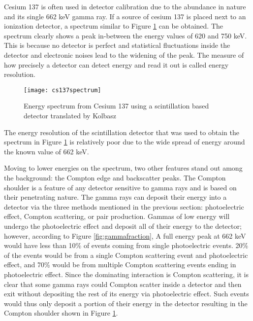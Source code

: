Cesium 137 is often used in detector calibration due to the abundance in nature and its single 662 keV gamma ray.
If a source of cesium 137 is placed next to an ionization detector, a spectrum similar to Figure \ref{fig:cs137spectrum} can be obtained.
The spectrum clearly shows a peak in-between the energy values of 620 and 750 keV.
This is because no detector is perfect and statistical fluctuations inside the detector and electronic noises lead to the widening of the peak.
The measure of how precisely a detector can detect energy and read it out is called energy resolution.
\begin{figure}[htpb]
\centering
\texttt{[image: cs137spectrum]}
\caption{Energy spectrum from Cesium 137 using a scintillation based detector \cite{CS137SPEC} translated by Kolbasz}
\label{fig:cs137spectrum}
\end{figure}
The energy resolution of the scintillation detector that was used to obtain the spectrum in Figure \ref{fig:cs137spectrum} is relatively poor due to the wide spread of energy around the known value of 662 keV.

Moving to lower energies on the spectrum, two other features stand out among the background: the Compton edge and backscatter peaks.
The Compton shoulder is a feature of any detector sensitive to gamma rays and is based on their penetrating nature.
The gamma rays can deposit their energy into a detector via the three methods mentioned in the previous section: photoelectric effect, Compton scattering, or pair production.
Gammas of low energy will undergo the photoelectric effect and deposit all of their energy to the detector; however, according to Figure \ref{fig:gammafraction}, A full energy peak at 662 keV would have less than 10\% of events coming from single photoelectric events.
20\% of the events would be from a single Compton scattering event and photoelectric effect, and 70\% would be from multiple Compton scattering events ending in photoelectric effect.
Since the dominating interaction is Compton scattering, it is clear that some gamma rays could Compton scatter inside a detector and then exit without depositing the rest of its energy via photoelectric effect.
Such events would thus only deposit a portion of their energy in the detector resulting in the Compton shoulder shown in Figure \ref{fig:cs137spectrum}.

